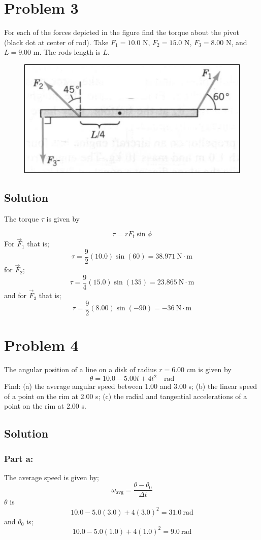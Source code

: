 \documentclass{article}
\begin{document}
\section*{Problem 3}
For each of the forces depicted in the figure find the torque about the pivot (black dot at
center of rod). Take $F_1 = 10.0$ N, $F_2 = 15.0$ N, $F_3 = 8.00$ N, and $L = 9.00$ m. The rods length
is $L$.

\begin{figure}[ht]
    \centering
    \includegraphics[scale=0.5]{drawing-2.png}
\end{figure}

\subsection*{Solution}
The torque $\tau$ is given by

\[
	\tau = rF_t\sin \phi
\]
For $\vec{F}_1$ that is;
\[
	\tau = \frac{9}{2}(10.0)\sin(60) = \boxed{38.971\ \text{N}\cdot\text{m}}
\]
for $\vec{F}_2$;
\[
	\tau = \frac{9}{4}(15.0)\sin(135) = \boxed{23.865\ \text{N}\cdot\text{m}}
\]
and for $\vec{F}_3$ that is;
\[
	\tau = \frac{9}{2}(8.00)\sin(-90) = \boxed{-36\ \text{N}\cdot\text{m}}
\]

\section*{Problem 4}
The angular position of a line on a disk of radius $r = 6.00$ cm is given by
\[
	\theta = 10.0 - 5.00 t + 4t^2 \quad \text{rad}
\]
Find: (a) the average angular speed between 1.00 and 3.00 s; (b) the linear speed of a point on
the rim at 2.00 s; (c) the radial and tangential accelerations of a point on the rim at 2.00 s.

\subsection*{Solution}
\subsubsection*{Part a:}
The average speed is given by;
\[
	\omega_\text{avg} = \frac{\theta -\theta_0}{\Delta t}
\]
$\theta$ is
\[
	10.0 - 5.0(3.0) + 4 (3.0)^2 = 31.0\ \text{rad}
\]
and $\theta_0$ is;
\[
	10.0 - 5.0(1.0) + 4(1.0)^2 = 9.0\ \text{rad}
\]
\end{document}
